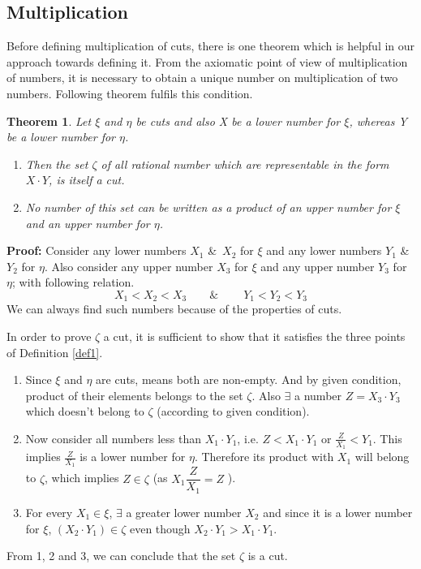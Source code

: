 \documentclass[12pt,a4paper,final,titlepage]{article}
\newtheorem{thm}{Theorem}
\begin{document}
\subsection{Multiplication}
Before defining multiplication of cuts, there is one theorem which is helpful in our approach towards defining it. From the axiomatic point of view of multiplication of numbers, it is necessary to obtain a unique number on multiplication of two numbers. Following theorem fulfils this condition.
\begin{thm}\label{thm9}
Let $\xi$ and $\eta$ be cuts and also X be a lower number for $\xi$, whereas Y be a lower number for $\eta$.
\begin{enumerate}
\item Then the set $\zeta$ of all rational number which are representable in the form $X\cdot Y$, is itself a cut.
\item No number of this set can be written as a product of an upper number for $\xi$ and an upper number for $\eta$.
\end{enumerate}
\end{thm}
\textbf{Proof:} Consider any lower numbers $X_1$ \&\ $X_2$ for $\xi$ and any lower numbers $Y_1$ \&\ $Y_2$ for $\eta$. Also consider any upper number $X_3$ for $\xi$ and any upper number $Y_3$ for $\eta$; with following relation.
\begin{equation}
X_1<X_2<X_3\qquad \&\ \qquad Y_1<Y_2<Y_3 \nonumber
\end{equation}
We can always find such numbers because of the properties of cuts.

In order to prove $\zeta$ a cut, it is sufficient to show that it satisfies the three points of Definition \ref{def1}. \\
\begin{enumerate}
\item Since $\xi$ and $\eta$ are cuts, means both are non-empty. And by given condition, product of their elements belongs to the set $\zeta$. Also $\exists$ a number $Z=X_3\cdot Y_3$ which doesn't belong to $\zeta$ (according to given condition).
\item Now consider all numbers less than $X_1\cdot Y_1$, i.e. $Z<X_1\cdot Y_1$ or $\frac{Z}{X_1} < Y_1$. This implies $\frac{Z}{X_1}$ is a lower number for $\eta$. Therefore its product with $X_1$ will belong to $\zeta$, which implies $Z\in \zeta$ (as $X_1\dfrac{Z}{X_1} = Z$ ).
\item For every $X_1\in \xi$, $\exists$ a greater lower number $X_2$ and since it is a lower number for $\xi$, $(X_2\cdot Y_1) \in \zeta$ even though $X_2\cdot Y_1 > X_1\cdot Y_1$.
\end{enumerate}
From 1, 2 and 3, we can conclude that the set $\zeta$ is a cut.\\
\end{document}
